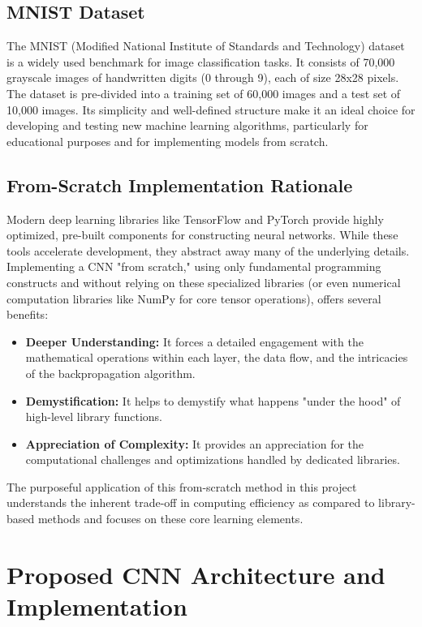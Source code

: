 \documentclass[conference]{IEEEtran}
\begin{document}
\subsection{MNIST Dataset}
The MNIST (Modified National Institute of Standards and Technology) dataset is a widely used benchmark for image classification tasks. It consists of 70,000 grayscale images of handwritten digits (0 through 9), each of size 28x28 pixels. The dataset is pre-divided into a training set of 60,000 images and a test set of 10,000 images. Its simplicity and well-defined structure make it an ideal choice for developing and testing new machine learning algorithms, particularly for educational purposes and for implementing models from scratch.

\subsection{From-Scratch Implementation Rationale}
Modern deep learning libraries like TensorFlow and PyTorch provide highly optimized, pre-built components for constructing neural networks. While these tools accelerate development, they abstract away many of the underlying details. Implementing a CNN "from scratch," using only fundamental programming constructs and without relying on these specialized libraries (or even numerical computation libraries like NumPy for core tensor operations), offers several benefits:
\begin{itemize}
    \item \textbf{Deeper Understanding:} It forces a detailed engagement with the mathematical operations within each layer, the data flow, and the intricacies of the backpropagation algorithm.
    \item \textbf{Demystification:} It helps to demystify what happens "under the hood" of high-level library functions.
    \item \textbf{Appreciation of Complexity:} It provides an appreciation for the computational challenges and optimizations handled by dedicated libraries.
\end{itemize}
The purposeful application of this from-scratch method in this project understands the inherent trade-off in computing efficiency as compared to library-based methods and focuses on these core learning elements.

\section{Proposed CNN Architecture and Implementation}
\end{document}
